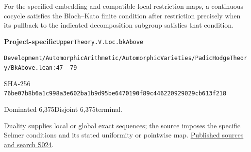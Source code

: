 
\begin{formalstatement}[D082]\label{decomp:D082}
For the specified embedding and compatible local restriction maps, a continuous cocycle satisfies the Bloch–Kato finite condition after restriction precisely when its pullback to the indicated decomposition subgroup satisfies that condition.
\end{formalstatement}
{\small\raggedright\noindent\textsf{\bfseries Project-specific}\quad \nolinkurl{UpperTheory.V.Loc.bkAbove}\par\noindent \nolinkurl{Development/AutomorphicArithmetic/AutomorphicVarieties/PadicHodgeTheory/BkAbove.lean:47--79}\par\noindent SHA-256 \nolinkurl{76be07b8b6a1c998a3e602ba1b9d95be6470190f89c446220929029cb613f218}\par\noindent Dominated 6,375\quad Disjoint 6,375\quad terminal.\par}
Duality supplies local or global exact sequences; the source imposes the specific Selmer conditions and its stated uniformity or pointwise map.
\hyperref[lit:S024]{Published sources and search S024}.
